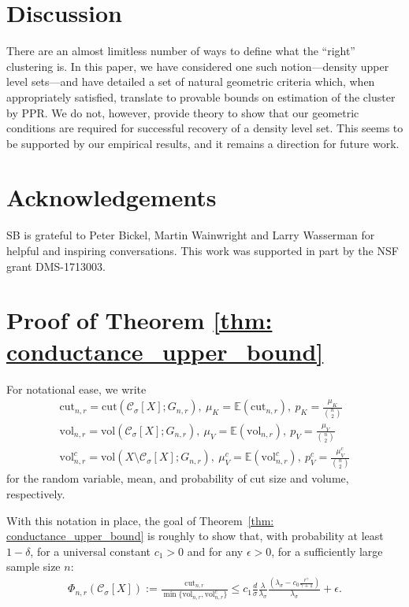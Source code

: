 \documentclass[11pt,twoside]{article}
\newcommand{\vol}{\mathrm{vol}}
\newcommand{\cut}{\mathrm{cut}}
\newcommand{\1}{\mathbf{1}}
\newcommand{\Xbf}{X}             %
\newcommand{\Cset}{\mathcal{C}}
\newcommand{\Csig}{\Cset_{\sigma}}
\begin{document}
\section{Discussion}
\label{sec: discussion}

There are an almost limitless number of ways to define what the ``right''
clustering is. In this paper, we have considered one such notion---density upper
level sets---and have detailed a set of natural geometric criteria which, when 
appropriately satisfied, translate to provable bounds on estimation of the
cluster by PPR. We do not, however, provide theory to show that our geometric
conditions are required for successful recovery of a density level set. This
seems to be supported by our empirical results, and it remains a direction for 
future work.  

\section{Acknowledgements}
SB is grateful to Peter Bickel, Martin Wainwright and Larry Wasserman for helpful and inspiring conversations. This work was supported in part by the NSF grant DMS-1713003.

\appendix

\section{Proof of Theorem \ref{thm: conductance_upper_bound}}
\label{sec: proof_of_theorem_1}

For notational ease, we write
\begin{align*}
\cut_{n,r} = \cut(\Csig[\Xbf]; G_{n,r}), ~ \mu_K = \mathbb{E}(\cut_{n,r}), ~ p_K = \frac{\mu_K}{{n \choose 2}} \\
\vol_{n,r} = \vol(\Csig[\Xbf]; G_{n,r}), ~ \mu_V = \mathbb{E}(\vol_{n,r}), ~ p_V = \frac{\mu_V}{{n \choose 2}} \\
\vol_{n,r}^c = \vol(\Xbf \setminus \Csig[\Xbf]; G_{n,r}), ~ \mu_V^c = \mathbb{E}(\vol_{n,r}^c), ~ p_V^c = \frac{\mu_V^c}{{n \choose 2}}
\end{align*}
for the random variable, mean, and probability of cut size and volume, respectively.

With this notation in place, the goal of Theorem~\ref{thm: conductance_upper_bound} is roughly to show that, with probability at least $1 - \delta$, for a universal constant $c_1 > 0$ and for any $\epsilon > 0$, for a sufficiently large sample size $n$:
\begin{align*}
\Phi_{n,r}(\Csig[\Xbf]) := \frac{\cut_{n,r}}{\min\{\vol_{n,r}, \vol_{n,r}^c\}} \leq c_1 \frac{d}{\sigma}
    \frac{\lambda}{\lambda_{\sigma}} \frac{(\lambda_{\sigma} -
      c_0\frac{r^{\gamma}}{\gamma+1})}{\lambda_{\sigma}} + \epsilon.
\end{align*}
\end{document}
